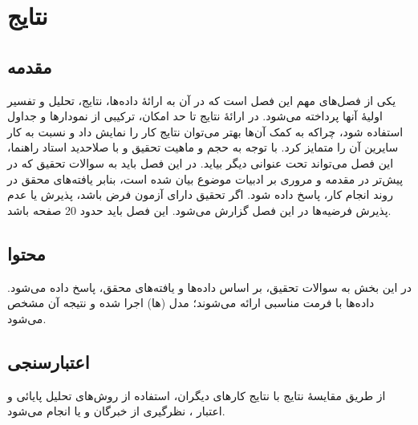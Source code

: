 \chapter{نتایج}
\label{chap:results}
\section{مقدمه} 
یکی از فصل‌های مهم  \پ  این فصل است که در آن به ارائهٔ داده‌ها، نتایج، تحلیل و تفسیر اولیهٔ آنها پرداخته می‌شود. در ارائهٔ نتایج تا حد امکان، ترکیبی از نمودارها و جداول استفاده شود، چراکه به کمک آن‌ها بهتر می‌توان نتایج کار را نمایش داد و نسبت به کار سایرین آن را متمایز کرد. با توجه به حجم و ماهیت تحقیق و با صلاحدید استاد راهنما، این فصل می‌تواند تحت عنوانی دیگر بیاید. در این فصل باید به سوالات تحقیق که در پیش‌تر در مقدمه و مروری بر ادبیات موضوع بیان شده است، بنابر یافته‌های محقق در روند انجام کار، پاسخ داده شود. اگر تحقیق دارای آزمون فرض باشد، پذیرش یا عدم پذیرش فرضیه‌ها در این فصل گزارش می‌شود. این فصل باید حدود 20 صفحه باشد.

\section{محتوا}
در این بخش به سوالات تحقیق، بر اساس داده‌ها و یافته‌های محقق، پاسخ داده می‌شود. داده‌ها با فرمت مناسبی ارائه می‌شوند؛ مدل (ها) اجرا شده و نتیجه آن مشخص می‌شود.

\section{اعتبارسنجی}
از طریق مقایسهٔ نتایج با نتایج کارهای دیگران، استفاده از روش‌های تحلیل پایائی
و اعتبار
،
نظرگیری از خبرگان
و یا
انجام می‌شود.

